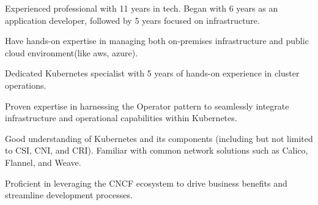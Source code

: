 

\begin{cvparagraph}

Experienced professional with 11 years in tech. Began with 6 years as an application developer, followed by 5 years focused on infrastructure. 

Have hands-on expertise in managing both on-premises infrastructure and public cloud environment(like aws, azure).

Dedicated Kubernetes specialist with 5 years of hands-on experience in cluster operations.

Proven expertise in harnessing the Operator pattern to seamlessly integrate infrastructure and operational capabilities within Kubernetes.

Good understanding of Kubernetes and its components (including but not limited to CSI, CNI, and CRI). Familiar with common network solutions such as Calico, Flannel, and Weave.

Proficient in leveraging the CNCF ecosystem to drive business benefits and streamline development processes.
 




\end{cvparagraph}



